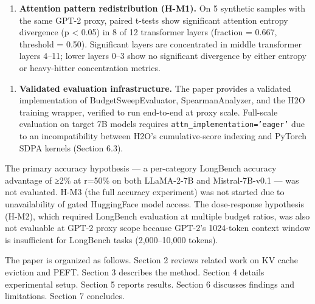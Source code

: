 \begin{enumerate}
\item \textbf{Attention pattern redistribution (H-M1).} On 5 synthetic samples with the same GPT-2 proxy, paired t-tests show significant attention entropy divergence (p < 0.05) in 8 of 12 transformer layers (fraction = 0.667, threshold = 0.50). Significant layers are concentrated in middle transformer layers 4–11; lower layers 0–3 show no significant divergence by either entropy or heavy-hitter concentration metrics.
\end{enumerate}

\begin{enumerate}
\item \textbf{Validated evaluation infrastructure.} The paper provides a validated implementation of BudgetSweepEvaluator, SpearmanAnalyzer, and the H2O training wrapper, verified to run end-to-end at proxy scale. Full-scale evaluation on target 7B models requires \texttt{attn_implementation='eager'} due to an incompatibility between H2O's cumulative-score indexing and PyTorch SDPA kernels (Section 6.3).
\end{enumerate}

The primary accuracy hypothesis — a per-category LongBench accuracy advantage of ≥2\% at r=50\% on both LLaMA-2-7B and Mistral-7B-v0.1 — was not evaluated. H-M3 (the full accuracy experiment) was not started due to unavailability of gated HuggingFace model access. The dose-response hypothesis (H-M2), which required LongBench evaluation at multiple budget ratios, was also not evaluable at GPT-2 proxy scope because GPT-2's 1024-token context window is insufficient for LongBench tasks (2,000–10,000 tokens).

The paper is organized as follows. Section 2 reviews related work on KV cache eviction and PEFT. Section 3 describes the method. Section 4 details experimental setup. Section 5 reports results. Section 6 discusses findings and limitations. Section 7 concludes.

